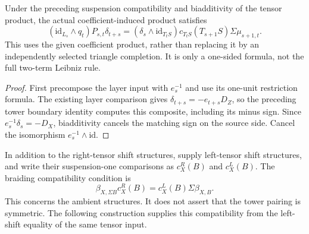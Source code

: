 \begin{proposition}
  \label{prop:h6-coefficient-side-boundary}
  \leanok
  Under the preceding suspension compatibility and biadditivity of the
  tensor product, the actual coefficient-induced product satisfies
  \[
    (\mathrm{id}_{L_s}\wedge q_t)P_{s,t}\delta_{t+s}
       =(\delta_s\wedge\mathrm{id}_{T_tS})c_{T_tS}(T_{s+1}S)
          \Sigma\mu_{s+1,t}.
  \]
  This uses the given coefficient product, rather than replacing it by
  an independently selected triangle completion. It is only a one-sided
  formula, not the full two-term Leibniz rule.
\end{proposition}
\begin{proof}
  First precompose the layer input with $e_s^{-1}$ and use its one-unit
  restriction formula. The existing layer comparison gives
  $\delta_{t+s}=-e_{t+s}D_Z$, so the preceding tower boundary identity
  computes this composite, including its minus sign. Since
  $e_s^{-1}\delta_s=-D_X$, biadditivity cancels the matching sign on the
  source side. Cancel the isomorphism $e_s^{-1}\wedge\mathrm{id}$.
  \leanok
\end{proof}

\begin{definition}
  \label{def:h6-tensor-suspension-braiding}
  \leanok
  In addition to the right-tensor shift structures, supply left-tensor
  shift structures, and write their suspension-one comparisons as
  $c_X^R(B)$ and $c_X^L(B)$. The braiding compatibility condition is
  \[
    \beta_{X,\Sigma B}c_X^R(B)=c_X^L(B)\Sigma\beta_{X,B}.
  \]
  This concerns the ambient structures. It does not assert that the
  tower pairing is symmetric. The following construction supplies this
  compatibility from the left-shift equality of the same tensor input.
\end{definition}

